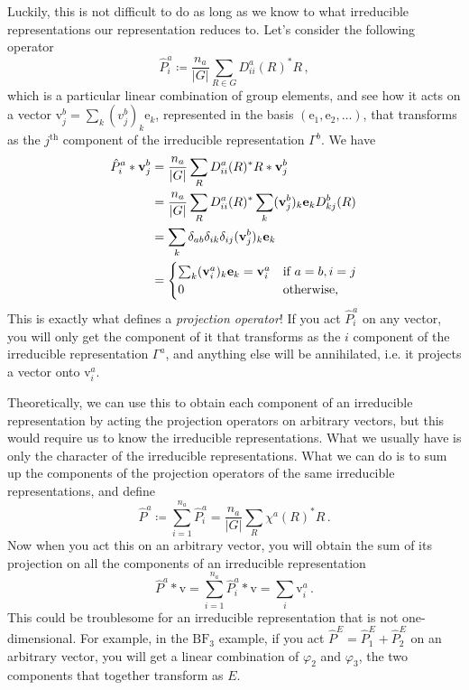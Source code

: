 \documentclass{article}
\theoremstyle{plain}\theoremheaderfont{\normalfont\itshape}\theorembodyfont{\rmfamily}\theoremseparator{.}\newtheorem*{rem}{Remark}\newtheorem*{ex}{Example}\newtheorem*{proof}{Proof}\newtheorem*{altp}{Alternative proof}
\theoremstyle{plain}\theoremheaderfont{\normalfont\bfseries}\theorembodyfont{\rmfamily}\theoremseparator{.}\newtheorem{thm}{Theorem}[section]\newtheorem{lem}[thm]{Lemma}\newtheorem{prop}[thm]{Proposition}\newtheorem*{cor}{Corollary}\newtheorem{defn}[thm]{Definition}\newtheorem{clm}[thm]{Claim}\newtheorem{clminproof}{Claim}\newtheorem*{law}{Law}\newtheorem{pos}[thm]{Postulate}
\theoremstyle{break}\theoremheaderfont{\normalfont\itshape}\theorembodyfont{\rmfamily}\theoremseparator{.\medskip}\newtheorem*{proofskip}{Proof}\newtheorem*{exs}{Examples}\newtheorem*{rems}{Remarks}
\theoremstyle{break}\theoremheaderfont{\normalfont\bfseries}\theorembodyfont{\rmfamily}\theoremseparator{.\medskip}\newtheorem{lemskip}[thm]{Lemma}\newtheorem{defnskip}[thm]{Definition}\newtheorem{propskip}[thm]{Proposition}\newtheorem{thmskip}[thm]{Theorem}
\numberwithin{equation}{section}
\newcommand{\vb}[1]{\bm{\mathrm{#1}}}
\newcommand{\abs}[1]{\left| #1 \right|}
\begin{document}
    Luckily, this is not difficult to do as long as we know to what irreducible representations our representation reduces to. Let's consider the following operator
    \begin{equation}
        \hat{P}_i^{a}\coloneqq\frac{n_a}{\abs{G}}\sum_{R\in G}D_{ii}^{a}(R)^* R\,,
    \end{equation}
    which is a particular linear combination of group elements, and see how it acts on a vector \(\vb{v}_j^{b}=\sum_k (v_j^b)_k\vb{e}_k\), represented in the basis \((\vb{e}_1,\vb{e}_2,\dots)\), that transforms as the \(j^{\text{th}}\) component of the irreducible representation \(\Gamma^{b}\). We have
    \begin{align}
        \hat{P}_i^a * \vb{v}_j^{b}&=\frac{n_a}{\abs{G}}\sum_{R}D_{ii}^{a}(R)^* R * \vb{v}_j^b \notag\\
        &=\frac{n_a}{\abs{G}}\sum_{R}D_{ii}^{a}(R)^*\sum_k (\vb{v}_j^b)_k\vb{e}_k D_{kj}^{b}(R) \notag\\
        &=\sum_{k} \delta_{ab}\delta_{ik}\delta_{ij} (\vb{v}_j^b)_k\vb{e}_k \notag\\
        &=\begin{cases}
            \sum_{k}(\vb{v}_i^a)_k\vb{e}_k=\vb{v}_i^{a} & \text{if }a=b,i=j \\
            0 & \text{otherwise,}
        \end{cases}
    \end{align}
    This is exactly what defines a \textit{projection operator}! If you act \(\hat{P}_i^{a}\) on any vector, you will only get the component of it that transforms as the \(i\) component of the irreducible representation \(\Gamma^a\), and anything else will be annihilated, i.e. it projects a vector onto \(\vb{v}_i^a\).

    Theoretically, we can use this to obtain each component of an irreducible representation by acting the projection operators on arbitrary vectors, but this would require us to know the irreducible representations. What we usually have is only the character of the irreducible representations. What we can do is to sum up the components of the projection operators of the same irreducible representations, and define
    \begin{equation}
        \hat{P}^a\coloneqq\sum_{i=1}^{n_a}\hat{P}_i^{a}=\frac{n_a}{\abs{G}}\sum_R\chi^a(R)^* R\,.
    \end{equation}
    Now when you act this on an arbitrary vector, you will obtain the sum of its projection on all the components of an irreducible representation
    \begin{equation}
        \hat{P}^a * \vb{v}=\sum_{i=1}^{n_a}\hat{P}_i^a * \vb{v}=\sum_{i}\vb{v}_i^{a}\,.
    \end{equation}
    This could be troublesome for an irreducible representation that is not one-dimensional. For example, in the \(\mathrm{BF_3}\) example, if you act \(\hat{P}^{E}=\hat{P}_1^{E}+\hat{P}_2^{E}\) on an arbitrary vector, you will get a linear combination of \(\varphi_2\) and \(\varphi_3\), the two components that together transform as \(E\).
\end{document}
